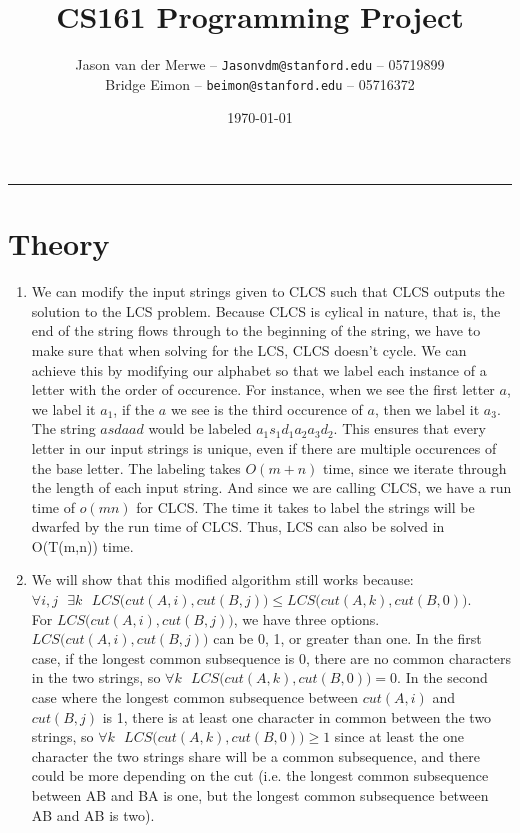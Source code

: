 \documentclass[12pt]{article}
\title{CS161 Programming Project}
\author{Jason van der Merwe -- \texttt{Jasonvdm@stanford.edu} -- 05719899\\
Bridge Eimon -- \texttt{beimon@stanford.edu} -- 05716372}
\date{\today}
\begin{document}
\maketitle

\vspace{-0.3in}
\rule{\linewidth}{0.4pt}


\section*{Theory}
\begin{enumerate}[label=(\alph*)]
    \item We can modify the input strings given to CLCS such that CLCS outputs the solution to the LCS problem. Because CLCS is cylical in nature, that is, the end of the string flows through to the beginning of the string, we have to make sure that when solving for the LCS, CLCS doesn't cycle. We can achieve this by modifying our alphabet so that we label each instance of a letter with the order of occurence. For instance, when we see the first letter $a$, we label it $a_1$, if the $a$ we see is the third occurence of $a$, then we label it $a_3$. The string $asdaad$ would be labeled $a_1s_1d_1a_2a_3d_2$. This ensures that every letter in our input strings is unique, even if there are multiple occurences of the base letter. The labeling takes $O(m+n)$ time, since we iterate through the length of each input string. And since we are calling CLCS, we have a run time of $o(mn)$ for CLCS. The time it takes to label the strings will be dwarfed by the run time of CLCS. Thus, LCS can also be solved in O(T(m,n)) time.\\ 
    \item We will show that this modified algorithm still works because:\\
     $\forall i,j \text{ } \exists k \text{ } LCS\big(cut(A,i), cut(B,j)\big) \le LCS\big(cut(A,k), cut(B,0)\big)$.\\
    For $LCS\big(cut(A,i), cut(B,j)\big)$, we have three options. $LCS\big(cut(A,i), cut(B,j)\big)$ can be 0, 1, or greater than one. In the first case, if the longest common subsequence is 0, there are no common characters in the two strings, so $\forall k \text{ } LCS\big(cut(A,k), cut(B,0)\big) = 0$. In the second case where the longest common subsequence between $cut(A,i)$ and $cut(B,j)$ is 1, there is at least one character in common between the two strings, so $\forall k \text{ } LCS\big(cut(A,k), cut(B,0)\big) \ge 1$ since at least the one character the two strings share will be a common subsequence, and there could be more depending on the cut (i.e. the longest common subsequence between AB and BA is one, but the longest common subsequence between AB and AB is two).\\

\end{enumerate}
\end{document}
